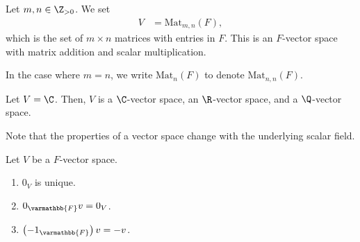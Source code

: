 \documentclass[10pt]{mypackage}
\renewcommand*{\mathbb}[1]{\varmathbb{#1}}
\begin{document}
\begin{example}[Matrices]
  Let $m,n\in \Z_{> 0}$. We set
  \begin{align*}
    V &= \text{Mat}_{m,n}\left(F\right),
  \end{align*}
  which is the set of $m\times n$ matrices with entries in $F$. This is an $F$-vector space with matrix addition and scalar multiplication.\newline

  In the case where $m = n$, we write $\text{Mat}_{n}\left(F\right)$ to denote $\text{Mat}_{n,n}\left(F\right)$.
\end{example}
\begin{example}
  Let $V = \C$. Then, $V$ is a $\C$-vector space, an $\R$-vector space, and a $\Q$-vector space.\newline

  Note that the properties of a vector space change with the underlying scalar field.
\end{example}
\begin{lemma}
  Let $V$ be a $F$-vector space.
  \begin{enumerate}[(1)]
    \item $0_V$ is unique.
    \item $0_{\mathbb{F}}v = 0_V$.
    \item $\left(-1_{\mathbb{F}}\right)v = -v$.
  \end{enumerate}
\end{lemma}
\end{document}
